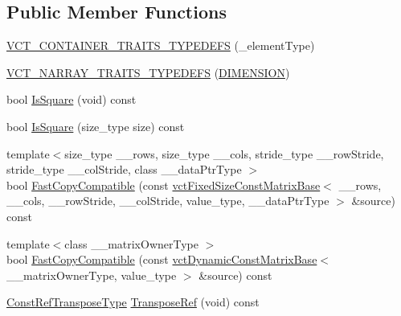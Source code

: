 \subsection*{Public Member Functions}
\begin{DoxyCompactItemize}
\item 
\hyperlink{classvct_fixed_size_const_matrix_base_a9689d334c93e1ff3dc68f22261889d6c}{V\-C\-T\-\_\-\-C\-O\-N\-T\-A\-I\-N\-E\-R\-\_\-\-T\-R\-A\-I\-T\-S\-\_\-\-T\-Y\-P\-E\-D\-E\-F\-S} (\-\_\-element\-Type)
\item 
\hyperlink{classvct_fixed_size_const_matrix_base_ab4f4b30b85de840a0ae41abb39f598de}{V\-C\-T\-\_\-\-N\-A\-R\-R\-A\-Y\-\_\-\-T\-R\-A\-I\-T\-S\-\_\-\-T\-Y\-P\-E\-D\-E\-F\-S} (\hyperlink{classvct_fixed_size_const_matrix_base_ab96748397b9d0700e8c892b7700c29b3a8f93683e9a4da14eb3a7005b19ad135f}{D\-I\-M\-E\-N\-S\-I\-O\-N})
\item 
bool \hyperlink{classvct_fixed_size_const_matrix_base_a895539d29d3fed780092490db3b99885}{Is\-Square} (void) const 
\item 
bool \hyperlink{classvct_fixed_size_const_matrix_base_a4b6ba47ff5a6995c4144a7b466058224}{Is\-Square} (size\-\_\-type size) const 
\item 
{\footnotesize template$<$size\-\_\-type \-\_\-\-\_\-rows, size\-\_\-type \-\_\-\-\_\-cols, stride\-\_\-type \-\_\-\-\_\-row\-Stride, stride\-\_\-type \-\_\-\-\_\-col\-Stride, class \-\_\-\-\_\-data\-Ptr\-Type $>$ }\\bool \hyperlink{classvct_fixed_size_const_matrix_base_aa0d994da3275ff6185ba37e16a6ba2e7}{Fast\-Copy\-Compatible} (const \hyperlink{classvct_fixed_size_const_matrix_base}{vct\-Fixed\-Size\-Const\-Matrix\-Base}$<$ \-\_\-\-\_\-rows, \-\_\-\-\_\-cols, \-\_\-\-\_\-row\-Stride, \-\_\-\-\_\-col\-Stride, value\-\_\-type, \-\_\-\-\_\-data\-Ptr\-Type $>$ \&source) const 
\item 
{\footnotesize template$<$class \-\_\-\-\_\-matrix\-Owner\-Type $>$ }\\bool \hyperlink{classvct_fixed_size_const_matrix_base_ad1a7a8dc7fbff508f7562c36b9660b89}{Fast\-Copy\-Compatible} (const \hyperlink{classvct_dynamic_const_matrix_base}{vct\-Dynamic\-Const\-Matrix\-Base}$<$ \-\_\-\-\_\-matrix\-Owner\-Type, value\-\_\-type $>$ \&source) const 
\item 
\hyperlink{classvct_fixed_size_const_matrix_base_a41d41a9a3dc6d0c8e36348a8c2fc83db}{Const\-Ref\-Transpose\-Type} \hyperlink{classvct_fixed_size_const_matrix_base_af8ce7322fff5aa54c0598938041a5096}{Transpose\-Ref} (void) const 
\item 

\end{DoxyCompactItemize}
